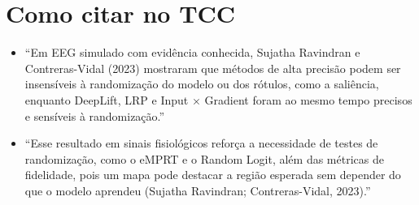 \documentclass[11pt,a4paper]{article}
\begin{document}
\section{Como citar no TCC}
\begin{itemize}
\item “Em EEG simulado com evidência conhecida, Sujatha Ravindran e Contreras-Vidal (2023) mostraram que métodos de alta precisão podem ser insensíveis à randomização do modelo ou dos rótulos, como a saliência, enquanto DeepLift, LRP e Input $\times$ Gradient foram ao mesmo tempo precisos e sensíveis à randomização.”
\item “Esse resultado em sinais fisiológicos reforça a necessidade de testes de randomização, como o eMPRT e o Random Logit, além das métricas de fidelidade, pois um mapa pode destacar a região esperada sem depender do que o modelo aprendeu (Sujatha Ravindran; Contreras-Vidal, 2023).”
\end{itemize}
\end{document}
